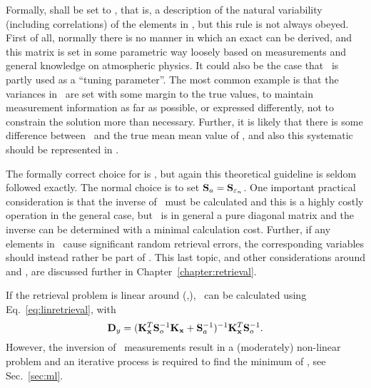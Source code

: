 Formally,  shall be set to \aCvrMtr{\SttVct} \citet{rodgers:00},
that is, a description of the natural variability (including correlations) of
the elements in \SttVct, but this rule is not always obeyed. First of all,
normally there is no manner in which an exact \aCvrMtr{\SttVct} can be derived,
and this matrix is set in some parametric way loosely based on measurements and
general knowledge on atmospheric physics. It could also be the case that
\ is partly used as a ``tuning parameter''. The most common example
is that the variances in \ are set with some margin to the true
values, to maintain measurement information as far as possible, or expressed
differently, not to constrain the solution more than necessary. Further, it is
likely that there is some difference between \ and the true mean
mean value of \SttVct, and also this systematic should be represented in
 \citep{eriksson:analy:00}.

The formally correct choice for  is 
\citep{eriksson:analy:00,rodgers:00}, but again this theoretical guideline is
seldom followed exactly. The normal choice is to set
$\mathbf{S}_{a}=\mathbf{S}_{\varepsilon_n}$. One important practical consideration is
that the inverse of \ must be calculated and this is a
highly costly operation in the general case, but \ is in
general a pure diagonal matrix and the inverse can be determined with a minimal
calculation cost. Further, if any elements in \FrwMdlVct\ cause significant
random retrieval errors, the corresponding variables should instead rather be
part of \SttVct. This last topic, and other considerations around 
and , are discussed further in Chapter~\ref{chapter:retrieval}.

If the retrieval problem is linear around (,\FrwMdlVctHat), \RtrVct\
can be calculated using Eq.~\ref{eq:linretrieval}, with
\citep[][Eq.~4.5]{rodgers:00}
\begin{equation}
  \label{eq:lindy}
  \mathbf{D}_{y} = (\mathbf{K}_{\mathbf{x}}^T\mathbf{S}_{o}^{-1}\mathbf{K}_{\mathbf{x}}
  +\mathbf{S}_{a}^{-1})^{-1}\mathbf{K}_{\mathbf{x}}^T\mathbf{S}_{o}^{-1}.
\end{equation}
However, the inversion of \smr\ measurements result in a (moderately)
non-linear problem and an iterative process is required to find the minimum of
\CstFnc, see Sec.~\ref{sec:ml}.


